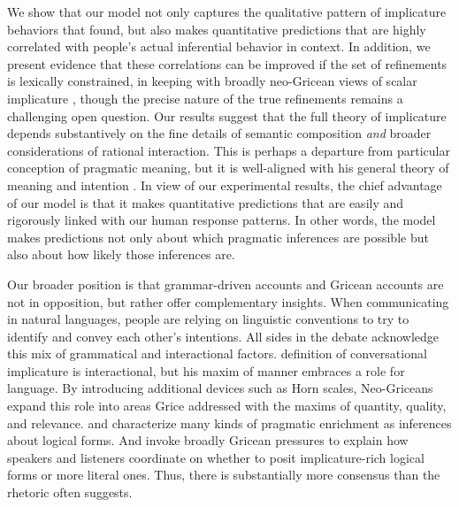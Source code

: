 \documentclass[leqno,12pt]{article}
\begin{document}

We show that our model not only captures the qualitative pattern of
implicature behaviors that \citeauthor{Chemla:Spector:2011} found, but
also makes quantitative predictions that are highly correlated with
people's actual inferential behavior in context. In addition, we
present evidence that these correlations can be improved if the set of
refinements is lexically constrained, in keeping with broadly
neo-Gricean views of scalar implicature
\citep{Horn72,Gazdar79b,Gazdar79a,SchulzVanRooij06}, though the
precise nature of the true refinements remains a challenging open
question.  Our results suggest that the full theory of implicature
depends substantively on the fine details of semantic composition
\emph{and} broader considerations of rational interaction. This is
perhaps a departure from  particular conception of
pragmatic meaning, but it is well-aligned with his general theory of
meaning and intention \citep{Grice89}.  In view of our experimental
results, the chief advantage of our model is that it makes
quantitative predictions that are easily and rigorously linked with
our human response patterns. In other words, the model makes
predictions not only about which pragmatic inferences are possible but
also about how likely those inferences are.

Our broader position is that grammar-driven accounts and Gricean
accounts are not in opposition, but rather offer complementary
insights.  When communicating in natural languages, people are relying
on linguistic conventions to try to identify and convey each other's
intentions. All sides in the debate acknowledge this mix of
grammatical and interactional factors.  definition
of conversational implicature is interactional, but his maxim of
manner embraces a role for language. By introducing additional devices
such as Horn scales, Neo-Griceans expand this role into areas Grice
addressed with the maxims of quantity, quality, and
relevance. \citet{Sperber95} and \citet{Bach94} characterize many
kinds of pragmatic enrichment as inferences about logical forms. And
\citet{ChierchiaFoxSpector08} invoke broadly Gricean pressures to
explain how speakers and listeners coordinate on whether to posit
implicature-rich logical forms or more literal ones. Thus, there is
substantially more consensus than the rhetoric often suggests.

\end{document}
